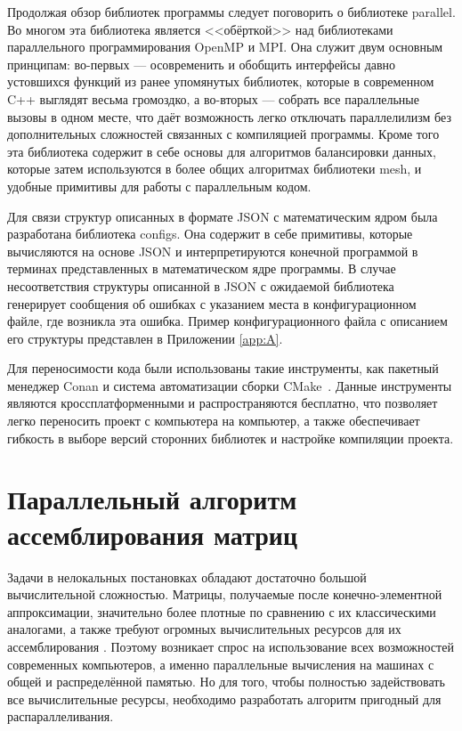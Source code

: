 Продолжая обзор библиотек программы следует поговорить о библиотеке parallel. Во многом эта библиотека является <<обёрткой>> над библиотеками параллельного программирования OpenMP и MPI. Она служит двум основным принципам: во-первых --- осовременить и обобщить интерфейсы давно устовшихся функций из ранее упомянутых библиотек, которые в современном C++ выглядят весьма громоздко, а во-вторых --- собрать все параллельные вызовы в одном месте, что даёт возможность легко отключать параллелилизм без дополнительных сложностей связанных с компиляцией программы. Кроме того эта библиотека содержит в себе основы для алгоритмов балансировки данных, которые затем используются в более общих алгоритмах библиотеки mesh, и удобные примитивы для работы с параллельным кодом.

Для связи структур описанных в формате JSON с математическим ядром была разработана библиотека configs. Она содержит в себе примитивы, которые вычисляются на основе JSON и интерпретируются конечной программой в терминах представленных в математическом ядре программы. В случае несоответствия структуры описанной в JSON с ожидаемой библиотека генерирует сообщения об ошибках с указанием места в конфигурационном файле, где возникла эта ошибка. Пример конфигурационного файла с описанием его структуры представлен в Приложении \ref{app:A}.

Для переносимости кода были использованы такие инструменты, как пакетный менеджер Conan \cite{Conan} и система автоматизации сборки \mbox{CMake \cite{CMake}.} Данные инструменты являются кроссплатформенными и распространяются бесплатно, что позволяет легко переносить проект с компьютера на компьютер, а также обеспечивает гибкость в выборе версий сторонних библиотек и настройке компиляции \mbox{проекта.}

\section{Параллельный алгоритм ассемблирования матриц}\label{sec:ProgramComplex/ParallelAlgorithm}

Задачи в нелокальных постановках обладают достаточно большой вычислительной сложностью. Матрицы, получаемые после конечно-элементной аппроксимации, значительно более плотные по сравнению с их классическими аналогами, а также требуют огромных вычислительных ресурсов для их ассемблирования \cite{AMCSM2019}. Поэтому возникает спрос на использование всех возможностей современных компьютеров, а именно параллельные вычисления на машинах с общей и распределённой памятью. Но для того, чтобы полностью задействовать все вычислительные ресурсы, необходимо разработать алгоритм пригодный для распараллеливания.

